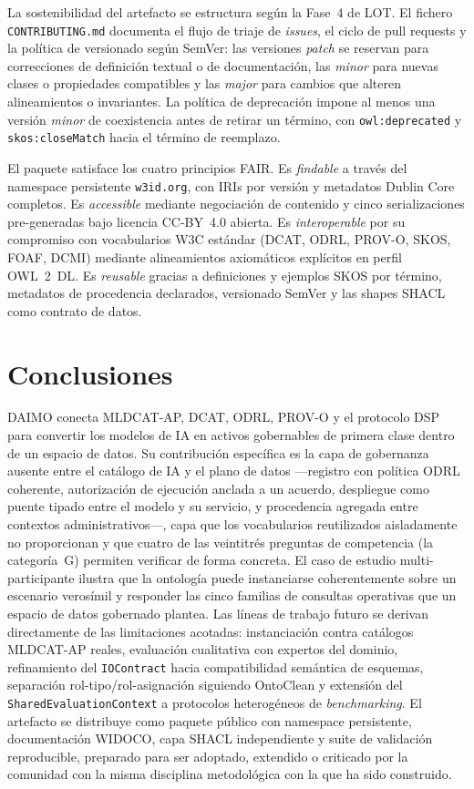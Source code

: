 \documentclass[11pt,a4paper]{article}
\newcommand{\code}[1]{\texttt{#1}}
\begin{document}
La sostenibilidad del artefacto se estructura según la Fase~4 de LOT. El fichero \code{CONTRIBUTING.md} documenta el flujo de triaje de \emph{issues}, el ciclo de pull requests y la política de versionado según SemVer: las versiones \emph{patch} se reservan para correcciones de definición textual o de documentación, las \emph{minor} para nuevas clases o propiedades compatibles y las \emph{major} para cambios que alteren alineamientos o invariantes. La política de deprecación impone al menos una versión \emph{minor} de coexistencia antes de retirar un término, con \code{owl:deprecated} y \code{skos:closeMatch} hacia el término de reemplazo.

El paquete satisface los cuatro principios FAIR. Es \emph{findable} a través del namespace persistente \code{w3id.org}, con IRIs por versión y metadatos Dublin Core completos. Es \emph{accessible} mediante negociación de contenido y cinco serializaciones pre-generadas bajo licencia CC-BY~4.0 abierta. Es \emph{interoperable} por su compromiso con vocabularios W3C estándar (DCAT, ODRL, PROV-O, SKOS, FOAF, DCMI) mediante alineamientos axiomáticos explícitos en perfil OWL~2~DL. Es \emph{reusable} gracias a definiciones y ejemplos SKOS por término, metadatos de procedencia declarados, versionado SemVer y las shapes SHACL como contrato de datos.

\section{Conclusiones}\label{sec:conclusion}

DAIMO conecta MLDCAT-AP, DCAT, ODRL, PROV-O y el protocolo DSP para convertir los modelos de IA en activos gobernables de primera clase dentro de un espacio de datos. Su contribución específica es la capa de gobernanza ausente entre el catálogo de IA y el plano de datos ---registro con política ODRL coherente, autorización de ejecución anclada a un acuerdo, despliegue como puente tipado entre el modelo y su servicio, y procedencia agregada entre contextos administrativos---, capa que los vocabularios reutilizados aisladamente no proporcionan y que cuatro de las veintitrés preguntas de competencia (la categoría~G) permiten verificar de forma concreta. El caso de estudio multi-participante ilustra que la ontología puede instanciarse coherentemente sobre un escenario verosímil y responder las cinco familias de consultas operativas que un espacio de datos gobernado plantea. Las líneas de trabajo futuro se derivan directamente de las limitaciones acotadas: instanciación contra catálogos MLDCAT-AP reales, evaluación cualitativa con expertos del dominio, refinamiento del \code{IOContract} hacia compatibilidad semántica de esquemas, separación rol-tipo/rol-asignación siguiendo OntoClean y extensión del \code{SharedEvaluationContext} a protocolos heterogéneos de \emph{benchmarking}. El artefacto se distribuye como paquete público con namespace persistente, documentación WIDOCO, capa SHACL independiente y suite de validación reproducible, preparado para ser adoptado, extendido o criticado por la comunidad con la misma disciplina metodológica con la que ha sido construido.
\end{document}
